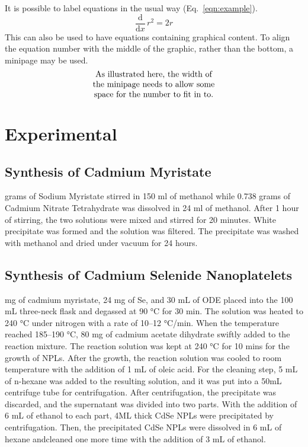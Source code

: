 \documentclass[journal=jacsat,manuscript=article]{achemso}
\begin{document}
It is possible to label equations in the usual way (Eq.~\ref{eqn:example}).
\begin{equation}
  \frac{\mathrm{d}}{\mathrm{d}x} \, r^2 = 2r \label{eqn:example}
\end{equation}
This can also be used to have equations containing graphical
content. To align the equation number with the middle of the graphic,
rather than the bottom, a minipage may be used.
\begin{equation}
  \begin{minipage}[c]{0.80\linewidth}
    \centering
    As illustrated here, the width of \\
    the minipage needs to allow some  \\
    space for the number to fit in to.
  \end{minipage}
  \label{eqn:graphic}
\end{equation}

\section{Experimental}
\subsection{Synthesis of Cadmium Myristate}
 grams of Sodium Myristate stirred in 150 ml of methanol while
0.738 grams of Cadmium Nitrate Tetrahydrate was dissolved in 24 ml of methanol.
After 1 hour of stirring, the two solutions were mixed and stirred for 20 minutes.
White precipitate was formed and the solution was filtered.
The precipitate was washed with methanol and dried under vacuum for 24 hours.

\subsection{Synthesis of Cadmium Selenide Nanoplatelets}
 mg of cadmium myristate, 24 mg of Se, and 30 mL of ODE placed
into the 100 mL three-neck flask and degassed at 90 °C for 30 min.
The solution was heated to 240 °C under nitrogen with a rate of
10--12 °C/min. When the temperature reached 185--190 °C,
80 mg of cadmium acetate dihydrate swiftly added to the
reaction mixture. The reaction solution was kept at 240 °C
for 10 mins for the growth of NPLs. After the growth,
the reaction solution was cooled to room temperature with
the addition of 1 mL of oleic acid. For the cleaning step,
5 mL of n-hexane was added to the resulting solution,
and it was put into a 50mL centrifuge tube for centrifugation.
After centrifugation, the precipitate was discarded,
and the supernatant was divided into two parts.
With the addition of 6 mL of ethanol to each part, 4ML
thick CdSe NPLs were precipitated by centrifugation.
Then, the precipitated CdSe NPLs were dissolved in
6 mL of hexane andcleaned one more time with the addition
of 3 mL of ethanol.
\end{document}
